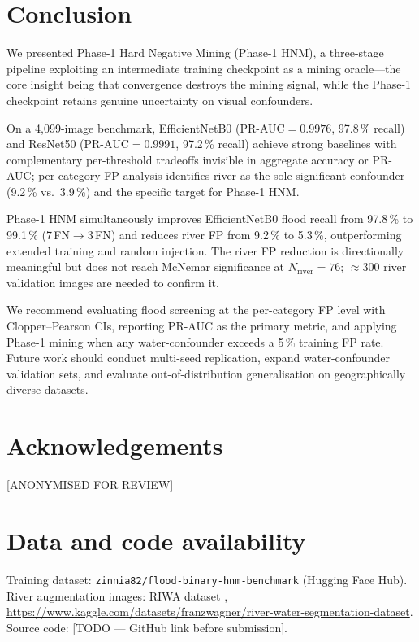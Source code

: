 \documentclass[a4paper,fleqn]{cas-sc}
\newcommand{\EffNet}{EfficientNetB0\xspace}
\newcommand{\ResNet}{ResNet50\xspace}
\newcommand{\PHNM}{Phase-1 HNM\xspace}
\newcommand{\PR}{PR-AUC\xspace}
\newcommand{\CP}{Clopper--Pearson\xspace}
\begin{document}
\section{Conclusion}
\label{sec:conclusion}

We presented Phase-1 Hard Negative Mining (\PHNM{}), a three-stage pipeline exploiting an
intermediate training checkpoint as a mining oracle---the core insight being that convergence
destroys the mining signal, while the Phase-1 checkpoint retains genuine uncertainty on visual confounders.

On a 4,099-image benchmark, \EffNet{} (PR-AUC$=0.9976$, 97.8\,\% recall) and \ResNet{}
(PR-AUC$=0.9991$, 97.2\,\% recall) achieve strong baselines with complementary per-threshold tradeoffs
invisible in aggregate accuracy or PR-AUC; per-category FP analysis identifies river as the sole
significant confounder (9.2\,\% vs.\ 3.9\,\%) and the specific target for \PHNM{}.

\PHNM{} simultaneously improves \EffNet{} flood recall from 97.8\,\% to 99.1\,\% (7\,FN$\to$3\,FN)
and reduces river FP from 9.2\,\% to 5.3\,\%, outperforming extended training and random injection.
The river FP reduction is directionally meaningful but does not reach McNemar significance at
$N_\text{river}{=}76$; $\approx$300 river validation images are needed to confirm it.

We recommend evaluating flood screening at the per-category FP level with \CP{} CIs,
reporting \PR{} as the primary metric, and applying Phase-1 mining when any water-confounder
exceeds a 5\,\% training FP rate.
Future work should conduct multi-seed replication, expand water-confounder validation sets,
and evaluate out-of-distribution generalisation on geographically diverse datasets.

\section*{Acknowledgements}
[ANONYMISED FOR REVIEW]

\section*{Data and code availability}
Training dataset: \texttt{zinnia82/flood-binary-hnm-benchmark} (Hugging Face Hub).
River augmentation images: RIWA dataset \cite{Wagner2023},
\url{https://www.kaggle.com/datasets/franzwagner/river-water-segmentation-dataset}.
Source code: [TODO --- GitHub link before submission].
\end{document}
